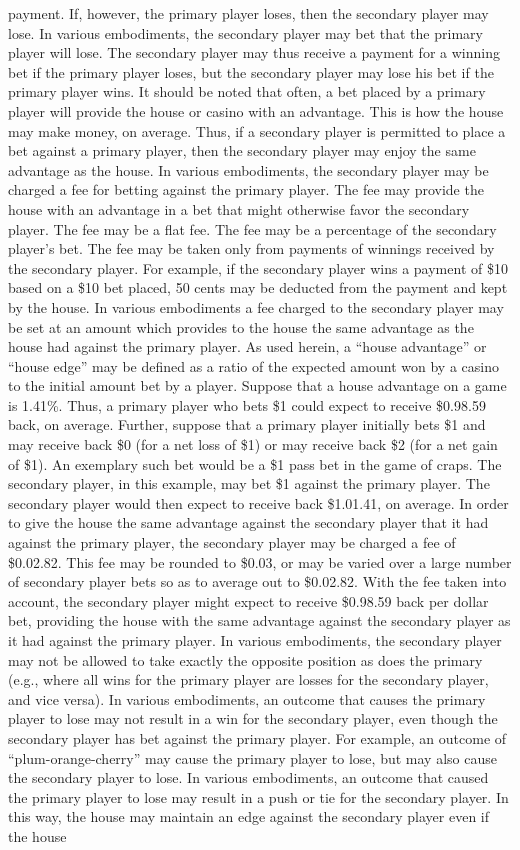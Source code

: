 \documentclass[11pt,a4paper]{article}
\begin{document}
payment. If, however, the primary player loses, then the secondary player may lose. In various embodiments, the secondary player may bet that the primary player will lose. The secondary player may thus receive a payment for a winning bet if the primary player loses, but the secondary player may lose his bet if the primary player wins. It should be noted that often, a bet placed by a primary player will provide the house or casino with an advantage. This is how the house may make money, on average. Thus, if a secondary player is permitted to place a bet against a primary player, then the secondary player may enjoy the same advantage as the house. In various embodiments, the secondary player may be charged a fee for betting against the primary player. The fee may provide the house with an advantage in a bet that might otherwise favor the secondary player. The fee may be a flat fee. The fee may be a percentage of the secondary player's bet. The fee may be taken only from payments of winnings received by the secondary player. For example, if the secondary player wins a payment of \$10 based on a \$10 bet placed, 50 cents may be deducted from the payment and kept by the house. In various embodiments a fee charged to the secondary player may be set at an amount which provides to the house the same advantage as the house had against the primary player. As used herein, a “house advantage” or “house edge” may be defined as a ratio of the expected amount won by a casino to the initial amount bet by a player. Suppose that a house advantage on a game is 1.41\%. Thus, a primary player who bets \$1 could expect to receive \$0.98.59 back, on average. Further, suppose that a primary player initially bets \$1 and may receive back \$0 (for a net loss of \$1) or may receive back \$2 (for a net gain of \$1). An exemplary such bet would be a \$1 pass bet in the game of craps. The secondary player, in this example, may bet \$1 against the primary player. The secondary player would then expect to receive back \$1.01.41, on average. In order to give the house the same advantage against the secondary player that it had against the primary player, the secondary player may be charged a fee of \$0.02.82. This fee may be rounded to \$0.03, or may be varied over a large number of secondary player bets so as to average out to \$0.02.82. With the fee taken into account, the secondary player might expect to receive \$0.98.59 back per dollar bet, providing the house with the same advantage against the secondary player as it had against the primary player. In various embodiments, the secondary player may not be allowed to take exactly the opposite position as does the primary (e.g., where all wins for the primary player are losses for the secondary player, and vice versa). In various embodiments, an outcome that causes the primary player to lose may not result in a win for the secondary player, even though the secondary player has bet against the primary player. For example, an outcome of “plum-orange-cherry” may cause the primary player to lose, but may also cause the secondary player to lose. In various embodiments, an outcome that caused the primary player to lose may result in a push or tie for the secondary player. In this way, the house may maintain an edge against the secondary player even if the house 
\end{document}
